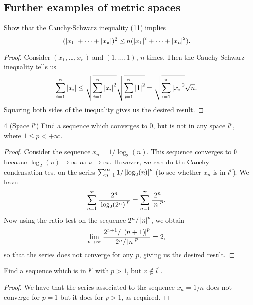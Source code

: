 \subsection{Further examples of metric spaces}


\begin{exercise}{3}
Show that the Cauchy-Schwarz inequality (11) implies 
\[
(\left\lvert x_1\right\rvert+\dots+\left\lvert x_n\right\rvert)^2 
\leq n (\left\lvert x_1\right\rvert^2+\dots+\left\lvert x_n\right\rvert^2).
\]
\end{exercise}
\begin{proof}
Consider $(x_1,\dots,x_n)$ and $(1,\dots,1)$, $n$ times. Then the Cauchy-Schwarz inequality tells us
\[
\sum^n_{i=1}\left\lvert x_i\right\rvert \leq
\sqrt{\sum_{i=1}^n\left\lvert x_i\right\rvert^2}\sqrt{\sum_{i=1}^n\left\lvert 1\right\rvert^2} 
=\sqrt{\sum_{i=1}^n\left\lvert x_i\right\rvert^2}\sqrt{n}.
\]
Squaring both sides of the inequality gives us the desired result.
\end{proof}

\begin{exercise}{4 (Space $l^p$)}
Find a sequence which converges to 0, but is not in any space $l^p$, where $1\leq p<+\infty$.
\end{exercise}
\begin{proof}
Consider the sequence $x_n=1/\log_2(n)$. This sequence converges to 0 because $\log_2(n)\to\infty$ as $n\to\infty$. However, we can do the Cauchy condensation test on the series $\sum_{n=1}^\infty 1/\left\lvert \log_2(n)\right\rvert^p$ (to see whether $x_n$ is in $l^p$). We have 
\begin{align*}
    \sum_{n=1}^\infty \frac{2^n}{\left\lvert \log_2(2^n)\right\rvert^p} 
    =\sum_{n=1}^\infty \frac{2^n}{\left\lvert n\right\rvert^p}.
\end{align*}
Now using the ratio test on the sequence $2^n/\left\lvert n\right\rvert^p$, we obtain
\[
\lim_{n\to\infty}\frac{2^{n+1}/\left\lvert (n+1)\right\rvert^p}{2^n/\left\lvert n\right\rvert^p} =2,
\]
so that the series does not converge for any $p$, giving us the desired result.
\end{proof}

\begin{exercise}{5}
Find a sequence which is in $l^p$ with $p>1$, but $x\notin l^1$.
\end{exercise}
\begin{proof}
We have that the series associated to the sequence $x_n=1/n$ does not converge for $p=1$ but it does for $p>1$, as required.
\end{proof}

